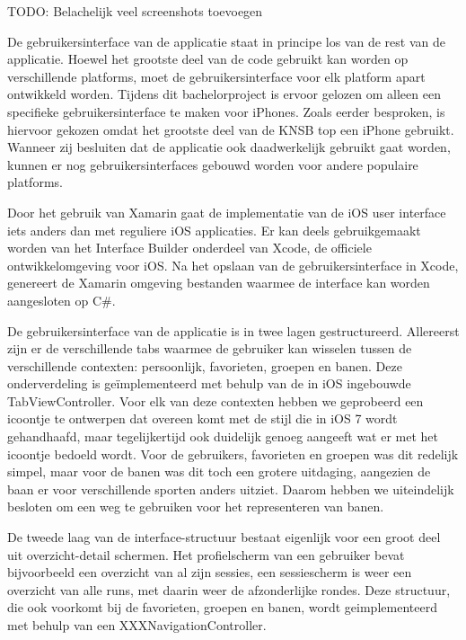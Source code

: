 {\par \bigskip \par \color{red} TODO: Belachelijk veel screenshots toevoegen \par \bigskip \par }

De gebruikersinterface van de applicatie staat in principe los van de rest van de applicatie. Hoewel het grootste deel van de code gebruikt kan worden op verschillende platforms, moet de gebruikersinterface voor elk platform apart ontwikkeld worden. Tijdens dit bachelorproject is ervoor gelozen om alleen een specifieke gebruikersinterface te maken voor iPhones. Zoals eerder besproken, is hiervoor gekozen omdat het grootste deel van de KNSB top een iPhone gebruikt. Wanneer zij besluiten dat de applicatie ook daadwerkelijk gebruikt gaat worden, kunnen er nog gebruikersinterfaces gebouwd worden voor andere populaire platforms.

Door het gebruik van Xamarin gaat de implementatie van de iOS user interface iets anders dan met reguliere iOS applicaties. Er kan deels gebruikgemaakt worden van het Interface Builder onderdeel van Xcode, de officiele ontwikkelomgeving voor iOS. Na het opslaan van de gebruikersinterface in Xcode, genereert de Xamarin omgeving bestanden waarmee de interface kan worden aangesloten op C\#.

De gebruikersinterface van de applicatie is in twee lagen gestructureerd. Allereerst zijn er de verschillende tabs waarmee de gebruiker kan wisselen tussen de verschillende contexten: persoonlijk, favorieten, groepen en banen. Deze onderverdeling is geïmplementeerd met behulp van de in iOS ingebouwde TabViewController. Voor elk van deze contexten hebben we geprobeerd een icoontje te ontwerpen dat overeen komt met de stijl die in iOS 7 wordt gehandhaafd, maar tegelijkertijd ook duidelijk genoeg aangeeft wat er met het icoontje bedoeld wordt. Voor de gebruikers, favorieten en groepen was dit redelijk simpel, maar voor de banen was dit toch een grotere uitdaging, aangezien de baan er voor verschillende sporten anders uitziet. Daarom hebben we uiteindelijk besloten om een weg te gebruiken voor het representeren van banen.

De tweede laag van de interface-structuur bestaat eigenlijk voor een groot deel uit overzicht-detail schermen. Het profielscherm van een gebruiker bevat bijvoorbeeld een overzicht van al zijn sessies, een sessiescherm is weer een overzicht van alle runs, met daarin weer de afzonderlijke rondes. Deze structuur, die ook voorkomt bij de favorieten, groepen en banen, wordt geimplementeerd met behulp van een XXXNavigationController.

